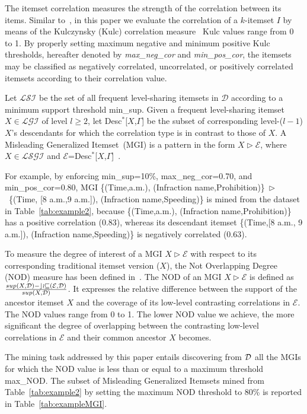 \documentclass[10pt, conference, compsocconf]{IEEEtran}
\newcommand{\MGI}{{\sc M}isleading {\sc G}eneralized {\sc I}temset}
\begin{document}
The itemset correlation measures the strength of the correlation between its items. Similar to~\cite{Flipping}, in this paper
we evaluate the correlation of a $k$-itemset $I$ by means of the Kulczynsky (Kulc) correlation measure~\cite{Wu2010Interestingness}
Kulc values range from 0 to 1. By properly setting maximum negative and minimum positive
Kulc thresholds, hereafter denoted by \textit{max\_neg\_cor} and \textit{min\_pos\_cor}, the itemsets may be classified as negatively correlated, uncorrelated, or positively correlated itemsets according to their correlation value.  

Let $\mathcal{LSI}$ be the set of all frequent level-sharing itemsets in $\mathcal{D}$ according to a minimum support threshold min\_sup. 
Given a frequent level-sharing itemset $X \in \mathcal{LGI}$ of level $l\geq2$, let 
Desc$^*$[$X$,$\Gamma$] be the subset of corresponding level-($l-1$) $X$'s descendants for which the correlation type is in contrast to those of $X$. 
A \MGI\ (MGI) is a pattern in the form $X \triangleright \mathcal{E}$, where $X \in \mathcal{LSGI}$ and $\mathcal{E}$=Desc$^*$[$X$,$\Gamma$]~\cite{MGI}. 

For example, by enforcing min\_sup=10\%, max\_neg\_cor=0.70, 
and min\_pos\_cor=0.80, MGI
\{(Time,a.m.), (Infraction name,Prohibition)\}~$\triangleright$~\{(Time, [8 a.m.,9 a.m.]), (Infraction name,Speeding)\} is 
mined from the dataset in Table~\ref{tab:example2}, 
because \{(Time,a.m.), (Infraction name,Prohibition)\} has a positive correlation (0.83), 
whereas its descendant itemset \{(Time,[8 a.m., 9 a.m.]), (Infraction name,Speeding)\} is negatively correlated (0.63).

To measure the degree of interest of a MGI $X \triangleright \mathcal{E}$ with respect to its corresponding traditional itemset version ($X$), 
the Not Overlapping Degree (NOD) measure has been defined in~\cite{MGI}. 
The NOD of an MGI $X \triangleright \mathcal{E}$ is defined as 
$\frac{\mbox{sup}(X,\cal{D})-\mbox{cov}(\mathcal{E},\cal{D})}{\mbox{sup}(X,\cal{D})}$.
It expresses the relative difference between the support of the ancestor itemset $X$ and the coverage of its low-level contrasting correlations in $\mathcal{E}$.
The NOD values range from 0 to 1. The lower NOD value we achieve, the more significant the degree of overlapping between 
the contrasting low-level correlations in $\mathcal{E}$ and their common ancestor $X$ becomes. 

The mining task addressed by this paper entails discovering from $\cal{D}$ all the MGIs for which
the NOD value is less than or equal to a maximum threshold max\_NOD. The subset of \MGI s mined from Table~\ref{tab:example2} by setting the maximum NOD threshold to 80\% is reported in Table~\ref{tab:exampleMGI}.
\end{document}
